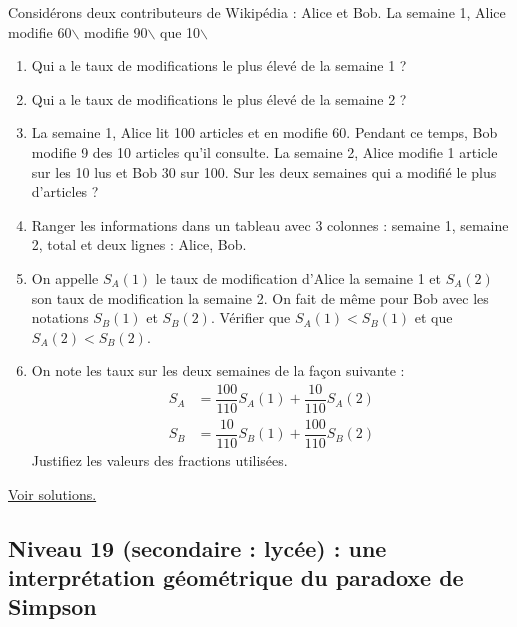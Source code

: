 \documentclass[11pt]{article}
\begin{document}
\label{org563567c}

Considérons deux contributeurs de Wikipédia : Alice et Bob. La semaine
1, Alice modifie 60$\backslash$%
modifie 90$\backslash$%
que 10$\backslash$%


\begin{enumerate}
\item Qui a le taux de modifications le plus élevé de la semaine 1 ?
\item Qui a le taux de modifications le plus élevé de la semaine 2 ?
\item La semaine 1, Alice lit 100 articles et en modifie 60. Pendant ce
temps, Bob modifie 9 des 10 articles qu'il consulte. La semaine 2,
Alice modifie 1 article sur les 10 lus et Bob 30 sur 100.
Sur les deux semaines qui a modifié le plus d'articles ?
\item Ranger les informations dans un tableau avec 3 colonnes : semaine
1, semaine 2, total et deux lignes : Alice, Bob.
\item On appelle \(S_A(1)\) le taux de modification d'Alice la semaine 1 et
\(S_A(2)\) son taux de modification la semaine 2. On fait de même
pour Bob avec les notations \(S_B(1)\) et \(S_B(2)\). Vérifier que
\(S_A(1) < S_B(1)\) et que \(S_A(2) < S_B(2)\).
\item On note les taux sur les deux semaines de la façon suivante :
\begin{align*}
       S_A &= \dfrac{100}{110}S_A(1) + \dfrac{10}{110}S_A(2) \\
       S_B &= \dfrac{10}{110}S_B(1) + \dfrac{100}{110}S_B(2)
\end{align*}
Justifiez les valeurs des fractions utilisées.
\end{enumerate}


\hyperref[org5595357]{Voir solutions.}

\newpage


\subsection{Niveau 19 (secondaire : lycée) : une interprétation géométrique du paradoxe de Simpson}
\label{sec:org28ad303}

\label{org5001152}
\end{document}
